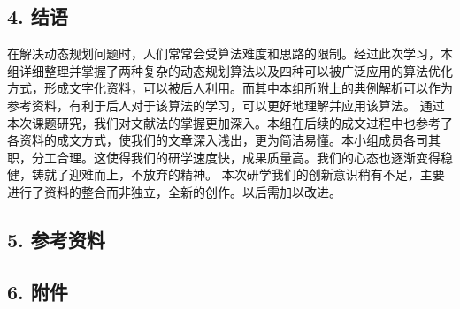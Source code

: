 \begin{Shaded}
\begin{Highlighting}[]
\OperatorTok{(}\OperatorTok{,}\OperatorTok{,}\OperatorTok{(}\OperatorTok{));}\OperatorTok{[}\OperatorTok{]=}\OperatorTok{;}
\OperatorTok{(}\OperatorTok{,}\OperatorTok{);}
\OperatorTok{\textless{}\textless{}}\OperatorTok{[}\OperatorTok{]\textless{}\textless{}}\CharTok{\textquotesingle{}}\CharTok{\textquotesingle{}}\OperatorTok{;}
     \OperatorTok{;}
\OperatorTok{\}}
\end{Highlighting}
\end{Shaded}

\subsection{4. 结语}

在解决动态规划问题时，人们常常会受算法难度和思路的限制。经过此次学习，本组详细整理并掌握了两种复杂的动态规划算法以及四种可以被广泛应用的算法优化方式，形成文字化资料，可以被后人利用。而其中本组所附上的典例解析可以作为参考资料，有利于后人对于该算法的学习，可以更好地理解并应用该算法。
通过本次课题研究，我们对文献法的掌握更加深入。本组在后续的成文过程中也参考了各资料的成文方式，使我们的文章深入浅出，更为简洁易懂。本小组成员各司其职，分工合理。这使得我们的研学速度快，成果质量高。我们的心态也逐渐变得稳健，铸就了迎难而上，不放弃的精神。
本次研学我们的创新意识稍有不足，主要进行了资料的整合而非独立，全新的创作。以后需加以改进。

\subsection{5. 参考资料}

\subsection{6. 附件}
